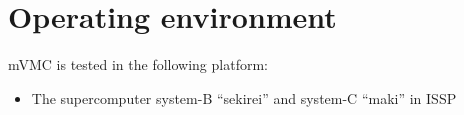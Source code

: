 \section{Operating environment}
mVMC is tested in the following platform:
\begin{itemize}
\item The supercomputer system-B ``sekirei'' and system-C ``maki'' in ISSP
\end{itemize}
